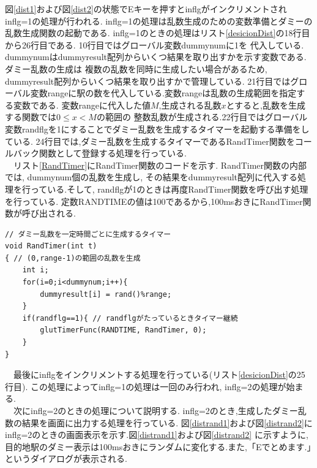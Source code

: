 \documentclass[a4j]{jarticle}
\begin{document}
        図\ref{dist1}および図\ref{dist2}の状態でEキーを押すとinflgがインクリメントされinflg=1の処理が行われる.
        inflg=1の処理は乱数生成のための変数準備とダミーの乱数生成関数の起動である.
        inflg=1のときの処理はリスト\ref{desicionDist}の18行目から26行目である. 10行目ではグローバル変数dummynumに1を
        代入している. dummynumはdummyresult配列からいくつ結果を取り出すかを示す変数である. ダミー乱数の生成は
        複数の乱数を同時に生成したい場合があるため, dummyresult配列からいくつ結果を取り出すかで管理している.
        21行目ではグローバル変数rangeに駅の数を代入している.変数rangeは乱数の生成範囲を指定する変数である.
        変数rangeに代入した値$M$,生成される乱数$x$とすると,乱数を生成する関数では$0 \leq x < M$の範囲の
        整数乱数が生成される.22行目ではグローバル変数randflgを1にすることでダミー乱数を生成するタイマーを起動する準備をしている.
        24行目では,ダミー乱数を生成するタイマーであるRandTimer関数をコールバック関数として登録する処理を行っている.\\
        　リスト\ref{RandTimer}にRandTimer関数のコードを示す. RandTimer関数の内部では, dummynum個の乱数を生成し,
        その結果をdummyresult配列に代入する処理を行っている.そして, randflgが1のときは再度RandTimer関数を呼び出す処理を行っている.
        定数RANDTIMEの値は100であるから,100msおきにRandTimer関数が呼び出される.
        \begin{lstlisting}[basicstyle=\ttfamily\footnotesize, frame=single,label=RandTimer,caption=RandTimer関数]
// ダミー乱数を一定時間ごとに生成するタイマー
void RandTimer(int t)
{ // (0,range-1)の範囲の乱数を生成
    int i;
    for(i=0;i<dummynum;i++){
        dummyresult[i] = rand()%range;
    }
    if(randflg==1){ // randflgがたっているときタイマー継続
        glutTimerFunc(RANDTIME, RandTimer, 0);
    }
}
        \end{lstlisting}
        　最後にinflgをインクリメントする処理を行っている(リスト\ref{desicionDist}の25行目).
        この処理によってinflg=1の処理は一回のみ行われ, inflg=2の処理が始まる.\\
        　次にinflg=2のときの処理について説明する. inflg=2のとき,生成したダミー乱数の結果を画面に出力する処理を行っている.
        図\ref{distrand1}および図\ref{distrand2}にinflg=2のときの画面表示を示す.図\ref{distrand1}および図\ref{distrand2}
        に示すように,目的地駅のダミー表示は100msおきにランダムに変化する.また,「Eでとめます.」というダイアログが表示される.
\end{document}
